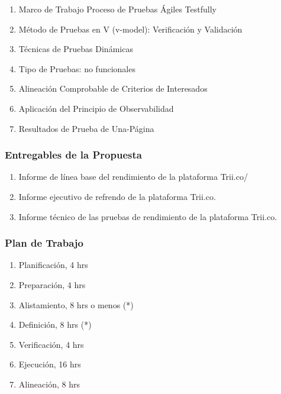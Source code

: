 \documentclass[
  paper=a4,
  ,captions=tableheading
]{scrartcl}
\providecommand{\tightlist}{%
  \setlength{\itemsep}{0pt}\setlength{\parskip}{0pt}}
\begin{document}
\begin{enumerate}
\def\labelenumi{\arabic{enumi}.}
\tightlist
\item
  Marco de Trabajo Proceso de Pruebas Ágiles Testfully
\item
  Método de Pruebas en V (v-model): Verificación y Validación
\item
  Técnicas de Pruebas Dinámicas
\item
  Tipo de Pruebas: no funcionales
\item
  Alineación Comprobable de Criterios de Interesados
\item
  Aplicación del Principio de Observabilidad
\item
  Resultados de Prueba de Una-Página
\end{enumerate}

\subsubsection{Entregables de la
Propuesta}\label{sec:entregables-de-la-propuesta}

\begin{enumerate}
\def\labelenumi{\arabic{enumi}.}
\tightlist
\item
  Informe de línea base del rendimiento de la plataforma Trii.co/
\item
  Informe ejecutivo de refrendo de la plataforma Trii.co.
\item
  Informe técnico de las pruebas de rendimiento de la plataforma
  Trii.co.
\end{enumerate}

\subsubsection{Plan de Trabajo}\label{sec:plan-de-trabajo}

\begin{enumerate}
\def\labelenumi{\arabic{enumi}.}
\tightlist
\item
  Planificación, 4 hrs
\item
  Preparación, 4 hrs
\item
  Alistamiento, 8 hrs o menos (*)
\item
  Definición, 8 hrs (*)
\item
  Verificación, 4 hrs
\item
  Ejecución, 16 hrs
\item
  Alineación, 8 hrs
\end{enumerate}
\end{document}
